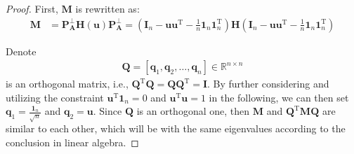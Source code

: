 \begin{proof}
First,   $  \mathbf {M} $ 
is rewritten
as:
\begin{align}\label{matrix_Mfor3} 
\mathbf {M} 
&=
\mathbf  P_{\mathbf  A } ^{\bot}   \mathbf H (\mathbf u)  \mathbf  P_{\mathbf  A }^{\bot}
=
(\mathbf  I_{n}  - 
\mathbf u\mathbf u^{\mathrm T}  
- \frac  1n \mathbf 1_{n}\mathbf 1_{n}^{\mathrm T} )
 \mathbf H
 (\mathbf  I_{n}  - 
 \mathbf u\mathbf u^{\mathrm T}  
 - \frac  1n \mathbf 1_{n}\mathbf 1_{n}^{\mathrm T} )
\end{align}  










Denote 
\begin{align}\label{Qmat}
\mathbf Q
=
[\mathbf q_{1},  \mathbf q_{2}, \dots,  \mathbf q_{n}] 
\in  
\mathbb R^{n \times n}
\end{align}
is  an  orthogonal  matrix, i.e., $\mathbf Q^{\mathrm T}\mathbf Q = \mathbf Q \mathbf Q^{\mathrm T} =\mathbf I$.
By  further  considering  and  utilizing  the constraint   $  \mathbf u^{\mathrm T}   \mathbf 1_{n} =0$   and  $  \mathbf u^{\mathrm T}   \mathbf u =1$  in the  following,  we  can  then  set 
$\mathbf q_{1} = 
\frac {\mathbf 1_{n}} { \sqrt{n}}$  and  $\mathbf q_{2} =  \mathbf u$.
Since   $ \mathbf Q $ is  an  orthogonal  one,  then  $ \mathbf M $  and   $ \mathbf Q^{\mathrm T}  
\mathbf  M
\mathbf Q $   are   similar  to each  other, which  will be    with  the  same   eigenvalues  according   to  the  conclusion in linear algebra. 



\end{proof}
